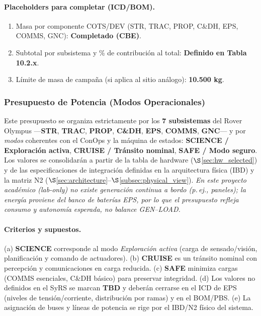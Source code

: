 \paragraph{Placeholders para completar (ICD/BOM).}
\begin{enumerate}
  \item Masa por componente COTS/DEV (STR, TRAC, PROP, C\&DH, EPS, COMMS, GNC): \textbf{Completado (CBE)}.
  \item Subtotal por subsistema y \% de contribución al total: \textbf{Definido en Tabla 10.2.x}.
  \item Límite de masa de campaña (si aplica al sitio análogo): \textbf{10.500 kg}.
\end{enumerate}

\subsubsection{Presupuesto de Potencia (Modos Operacionales)}
\label{sec:power_budget}

Este presupuesto se organiza estrictamente por los \textbf{7 subsistemas} del Rover Olympus —\textbf{STR}, \textbf{TRAC}, \textbf{PROP}, \textbf{C\&DH}, \textbf{EPS}, \textbf{COMMS}, \textbf{GNC}— y por \emph{modos} coherentes con el ConOps y la máquina de estados: \textbf{SCIENCE / Exploración activa}, \textbf{CRUISE / Tránsito nominal}, \textbf{SAFE / Modo seguro}. Los valores se consolidarán a partir de la tabla de hardware ($\S$\ref{sec:hw_selected}) y de las especificaciones de integración definidas en la arquitectura física (IBD) y la matriz N2 ($\S$\ref{sec:architecture}--$\S$\ref{subsec:physical_view}). \textit{En este proyecto académico (lab-only) no existe generación continua a bordo (p.\,ej., paneles); la energía proviene del banco de baterías EPS, por lo que el presupuesto refleja \emph{consumo} y \emph{autonomía} esperada, no balance GEN--LOAD.} \cite{nasa_cm}

\paragraph{Criterios y supuestos.}
(a) \textbf{SCIENCE} corresponde al modo \emph{Exploración activa} (carga de sensado/visión, planificación y comando de actuadores). (b) \textbf{CRUISE} es un tránsito nominal con percepción y comunicaciones en carga reducida. (c) \textbf{SAFE} minimiza cargas (COMMS esenciales, C\&DH básico) para preservar integridad. (d) Los valores no definidos en el SyRS se marcan \textbf{TBD} y deberán cerrarse en el ICD de EPS (niveles de tensión/corriente, distribución por ramas) y en el BOM/PBS. (e) La asignación de buses y líneas de potencia se rige por el IBD/N2 físico del sistema. \cite{nasa_cm}

